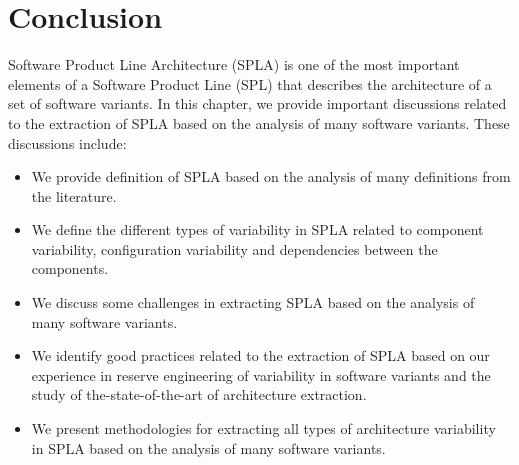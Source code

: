 \documentclass[graybox]{svmult}
\begin{document}
\section{Conclusion}
\label{sec:conclusion}

Software Product Line Architecture (SPLA) is one of the most important elements of a Software Product Line (SPL) that describes the architecture of a set of software variants. In this chapter, we provide important discussions related to the extraction of SPLA based on the analysis of many software variants. These discussions include: 
\begin{itemize}
\item We provide definition of SPLA based on the analysis of many definitions from the literature.

\item We define the different types of variability in SPLA related to component variability, configuration variability and dependencies between the components.

\item We discuss some challenges in extracting SPLA based on the analysis of many software variants.

\item We identify good practices related to the extraction of SPLA based on our experience in reserve engineering of variability in software variants and the study of the-state-of-the-art of architecture extraction.

\item We present methodologies for extracting all types of architecture variability in SPLA based on the analysis of many software variants.
\end{itemize}




%



%

\printindex
\end{document}
